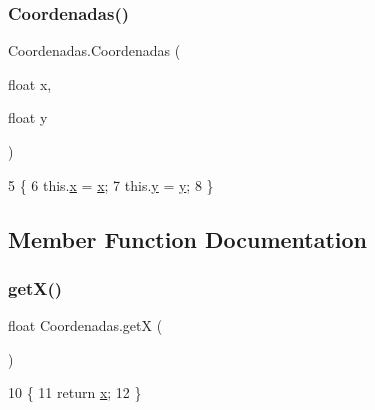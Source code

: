 \subsubsection{\texorpdfstring{Coordenadas()}{Coordenadas()}}
{\footnotesize\ttfamily Coordenadas.\+Coordenadas (\begin{DoxyParamCaption}\item[{float}]{x,  }\item[{float}]{y }\end{DoxyParamCaption})\hspace{0.3cm}{\ttfamily [inline]}}


\begin{DoxyCode}
5                                         \{
6         this.\mbox{\hyperlink{class_coordenadas_a89574ed799dfc39e198c8e8096670bf1}{x}} = \mbox{\hyperlink{class_coordenadas_a89574ed799dfc39e198c8e8096670bf1}{x}};
7         this.\mbox{\hyperlink{class_coordenadas_a6b4555727809eb63ae63e171533476b8}{y}} = \mbox{\hyperlink{class_coordenadas_a6b4555727809eb63ae63e171533476b8}{y}};
8     \}
\end{DoxyCode}


\subsection{Member Function Documentation}
\mbox{\label{class_coordenadas_a7b3fc725f9146220813dc0084fecc3ca}} 
\subsubsection{\texorpdfstring{get\+X()}{getX()}}
{\footnotesize\ttfamily float Coordenadas.\+getX (\begin{DoxyParamCaption}{ }\end{DoxyParamCaption})\hspace{0.3cm}{\ttfamily [inline]}}


\begin{DoxyCode}
10                         \{
11         \textcolor{keywordflow}{return} \mbox{\hyperlink{class_coordenadas_a89574ed799dfc39e198c8e8096670bf1}{x}};
12     \}
\end{DoxyCode}
\mbox{\label{class_coordenadas_aa10f46c8c62df3db3a05d4550f20b197}} 
